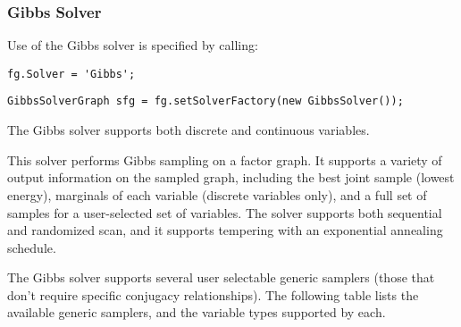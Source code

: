 \clearpage
\subsubsection{Gibbs Solver}
\label{sec:GibbsSolverAPI}

Use of the Gibbs solver is specified by calling:

\ifmatlab
\begin{lstlisting}
fg.Solver = 'Gibbs';
\end{lstlisting}
\fi


\ifjava
\begin{lstlisting}
GibbsSolverGraph sfg = fg.setSolverFactory(new GibbsSolver());
\end{lstlisting}
\fi

The Gibbs solver supports both discrete and continuous variables.

This solver performs Gibbs sampling on a factor graph.  It supports a variety of output information on the sampled graph, including the best joint sample (lowest energy), marginals of each variable (discrete variables only), and a full set of samples for a user-selected set of variables.  The solver supports both sequential and randomized scan, and it supports tempering with an exponential annealing schedule.

The Gibbs solver supports several user selectable generic samplers (those that don't require specific conjugacy relationships).  The following table lists the available generic samplers, and the variable types supported by each.

